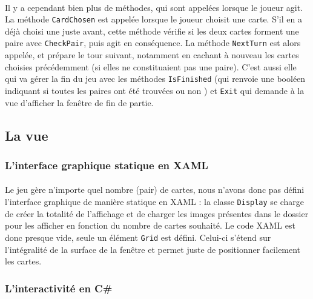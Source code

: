 \paragraph{}Il y a cependant bien plus de méthodes, qui sont appelées lorsque le joueur agit. La méthode \lstinline|CardChosen| est appelée lorsque le joueur choisit une carte. S'il en a déjà choisi une juste avant, cette méthode vérifie si les deux cartes forment une paire avec \lstinline|CheckPair|, puis agit en conséquence. La méthode \lstinline|NextTurn| est alors appelée, et prépare le tour suivant, notamment en cachant à nouveau les cartes choisies précédemment (si elles ne constituaient pas une paire). C'est aussi elle qui va gérer la fin du jeu avec les méthodes \lstinline|IsFinished| (qui renvoie une booléen indiquant si toutes les paires ont été trouvées ou non ) et \lstinline|Exit| qui demande à la vue d'afficher la fenêtre de fin de partie.

\subsection{La vue}

\subsubsection{L'interface graphique statique en XAML}

\paragraph{}Le jeu gère n'importe quel nombre (pair) de cartes, nous n'avons donc pas défini l'interface graphique de manière statique en XAML : la classe \lstinline|Display| se charge de créer la totalité de l'affichage et de charger les images présentes dans le dossier pour les afficher en fonction du nombre de cartes souhaité. Le code XAML est donc presque vide, seule un élément \lstinline|Grid| est défini. Celui-ci s'étend sur l'intégralité de la surface de la fenêtre et permet juste de positionner facilement les cartes.


\subsubsection{L'interactivité en C\#}

